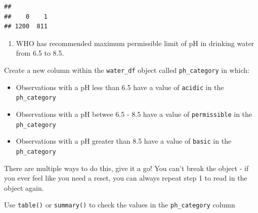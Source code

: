 \documentclass[
]{book}
\newenvironment{Shaded}{\begin{snugshade}}{\end{snugshade}}
\newcommand{\FloatTok}[1]{\textcolor[rgb]{0.00,0.00,0.81}{#1}}
\newcommand{\FunctionTok}[1]{\textcolor[rgb]{0.13,0.29,0.53}{\textbf{#1}}}
\newcommand{\NormalTok}[1]{#1}
\newcommand{\OtherTok}[1]{\textcolor[rgb]{0.56,0.35,0.01}{#1}}
\newcommand{\SpecialCharTok}[1]{\textcolor[rgb]{0.81,0.36,0.00}{\textbf{#1}}}
\newcommand{\StringTok}[1]{\textcolor[rgb]{0.31,0.60,0.02}{#1}}
\providecommand{\tightlist}{%
  \setlength{\itemsep}{0pt}\setlength{\parskip}{0pt}}
\begin{document}
\begin{Shaded}
\end{Shaded}

\begin{verbatim}
## 
##    0    1 
## 1200  811
\end{verbatim}

\begin{enumerate}
\def\labelenumi{\arabic{enumi}.}
\setcounter{enumi}{3}
\tightlist
\item
  WHO has recommended maximum permissible limit of pH in drinking water from 6.5 to 8.5.
\end{enumerate}

Create a new column within the \texttt{water\_df} object called \texttt{ph\_category} in which:

\begin{itemize}
\tightlist
\item
  Observations with a pH less than 6.5 have a value of \texttt{acidic} in the \texttt{ph\_category}
\item
  Observations with a pH betwee 6.5 - 8.5 have a value of \texttt{permissible} in the \texttt{ph\_category}
\item
  Observations with a pH greater than 8.5 have a value of \texttt{basic} in the \texttt{ph\_category}
\end{itemize}

There are multiple ways to do this, give it a go! You can't break the object - if you ever feel like you need a reset, you can always repeat step 1 to read in the object again.

Use \texttt{table()} or \texttt{summary()} to check the values in the \texttt{ph\_category} column

\begin{Shaded}
\end{Shaded}
\end{document}

